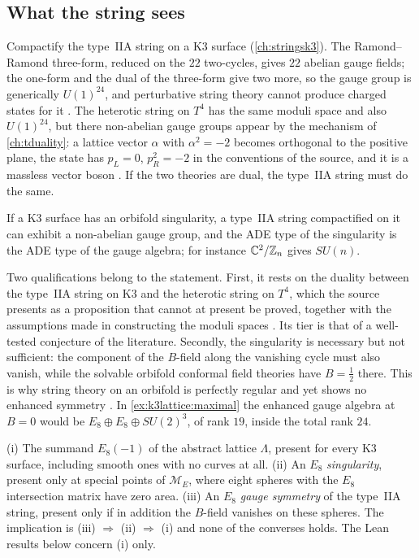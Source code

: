 \subsection{What the string sees}
Compactify the type~IIA string on a K3 surface (\cref{ch:stringsk3}). The Ramond--Ramond
three-form, reduced on the $22$ two-cycles, gives $22$ abelian gauge fields; the one-form
and the dual of the three-form give two more, so the gauge group is generically $U(1)^{24}$,
and perturbative string theory cannot produce charged states for it
. The heterotic string on $T^4$ has the same moduli space
and also $U(1)^{24}$, but there non-abelian gauge groups appear by the mechanism of
\cref{ch:tduality}: a lattice vector $\alpha$ with $\alpha^2=-2$ becomes orthogonal to the
positive plane, the state has $p_L=0$, $p_R^2=-2$ in the conventions of the source, and it is
a massless vector boson . If the two theories are dual, the
type~IIA string must do the same.

\begin{proposition}
\label{prop:k3lattice:gauge}
If a K3 surface has an orbifold singularity, a type~IIA string compactified on it can
exhibit a non-abelian gauge group, and the ADE type of the singularity is the ADE type of the
gauge algebra; for instance $\mathbb{C}^2/\mathbb{Z}_n$ gives $SU(n)$. \TL{}
\end{proposition}
Two qualifications belong to the statement. First, it rests on the duality between the
type~IIA string on K3 and the heterotic string on $T^4$, which the source presents as a
proposition that cannot at present be proved, together with the assumptions made in
constructing the moduli spaces . Its tier is that of a
well-tested conjecture of the literature. Secondly, the singularity is necessary but not
sufficient: the component of the $B$-field along the vanishing cycle must also vanish, while
the solvable orbifold conformal field theories have $B=\tfrac12$ there. This is why string
theory on an orbifold is perfectly regular and yet shows no enhanced symmetry
. In \cref{ex:k3lattice:maximal} the enhanced gauge algebra
at $B=0$ would be $E_8\oplus E_8\oplus SU(2)^3$, of rank $19$, inside the total rank $24$.

\begin{pitfallbox}
(i) The summand $E_8(-1)$ of the abstract lattice $\Lambda$, present for every K3 surface,
including smooth ones with no curves at all. (ii) An $E_8$ \emph{singularity}, present only
at special points of $\mathcal M_E$, where eight spheres with the $E_8$ intersection matrix
have zero area. (iii) An $E_8$ \emph{gauge symmetry} of the type~IIA string, present only if
in addition the $B$-field vanishes on these spheres. The implication is (iii) $\Rightarrow$
(ii) $\Rightarrow$ (i) and none of the converses holds. The Lean results below concern (i)
only.
\end{pitfallbox}

